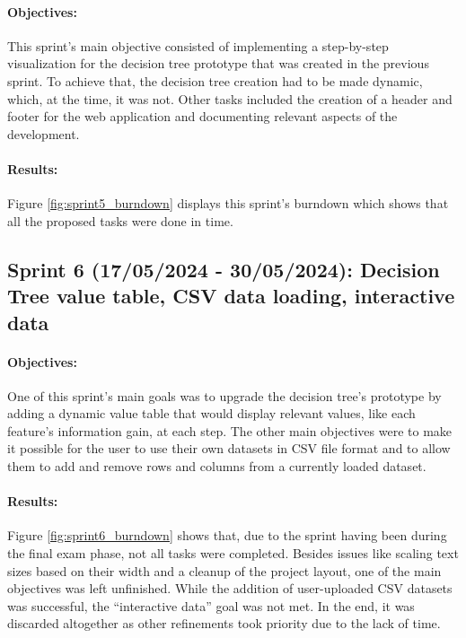 \paragraph{Objectives:}
This sprint's main objective consisted of implementing a step-by-step visualization for the decision tree prototype that was created in the previous sprint. To achieve that, the decision tree creation had to be made dynamic, which, at the time, it was not. Other tasks included the creation of a header and footer for the web application and documenting relevant aspects of the development.

\paragraph{Results:}
Figure \ref{fig:sprint5_burndown} displays this sprint's burndown which shows that all the proposed tasks were done in time.

\subsection{Sprint 6 (17/05/2024 - 30/05/2024): Decision Tree value table, CSV data loading, interactive data}
\paragraph{Objectives:}
One of this sprint's main goals was to upgrade the decision tree's prototype by adding a dynamic value table that would display relevant values, like each feature's information gain, at each step. The other main objectives were to make it possible for the user to use their own datasets in CSV file format and to allow them to add and remove rows and columns from a currently loaded dataset.

\paragraph{Results:}
Figure \ref{fig:sprint6_burndown} shows that, due to the sprint having been during the final exam phase, not all tasks were completed. Besides issues like scaling text sizes based on their width and a cleanup of the project layout, one of the main objectives was left unfinished. While the addition of user-uploaded CSV datasets was successful, the ``interactive data'' goal was not met. In the end, it was discarded altogether as other refinements took priority due to the lack of time.

